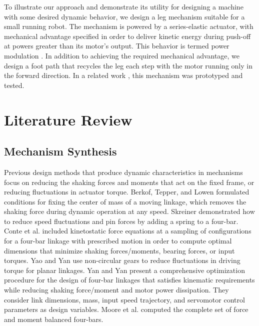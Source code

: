 \documentclass[journal]{IEEEtran}
\begin{document}
To illustrate our approach and demonstrate its utility for designing a machine with some desired dynamic behavior, 
we design a leg mechanism suitable for a small running robot.
The mechanism is powered by a series-elastic actuator, with mechanical advantage specified in order to deliver kinetic energy during push-off at powers greater than its motor's output.
This behavior is termed power modulation \cite{haldaneRoboticVerticalJumping2016}.
In addition to achieving the required mechanical advantage, we design a foot path that recycles the leg each step with the motor running only in the forward direction.
In a related work \cite{plecnikAdjustablePowerModulation2019}, this mechanism was prototyped and tested.



\section{Literature Review}
\label{sec:lit_rev}

\subsection{Mechanism Synthesis}
\label{sec:mech_synth}

Previous design methods that produce dynamic characteristics in mechanisms focus on reducing the shaking forces and moments that act on the fixed frame, or reducing fluctuations in actuator torque.
Berkof, Tepper, and Lowen \cite{berkofNewMethodCompletely1969,tepperGeneralTheoremsConcerning1972,lowenBalancingLinkagesUpdate1983} formulated conditions for fixing the center of mass of a moving linkage, which removes the shaking force during dynamic operation at any speed.
Skreiner \cite{skreinerDynamicAnalysisUsed1970} demonstrated how to reduce speed fluctuations and pin forces by adding a spring to a four-bar.
Conte et al. \cite{conteOptimumMechanismDesign1975} included kinetostatic force equations at a sampling of configurations for a four-bar linkage with prescribed motion in order to compute optimal dimensions that minimize shaking forces/moments, bearing forces, or input torques.
Yao and Yan \cite{yaoNewMethodTorque2003} use non-circular gears to reduce fluctuations in driving torque for planar linkages.
Yan and Yan \cite{yanIntegratedControlMechanism2009} present a comprehensive optimization procedure for the design of four-bar linkages that satisfies kinematic requirements while reducing shaking force/moment and motor power dissipation.  They consider link dimensions, mass, input speed trajectory, and servomotor control parameters as design variables.
Moore et al. \cite{mooreDeterminationCompleteSet2009} computed the complete set of force and moment balanced four-bars.
\end{document}
